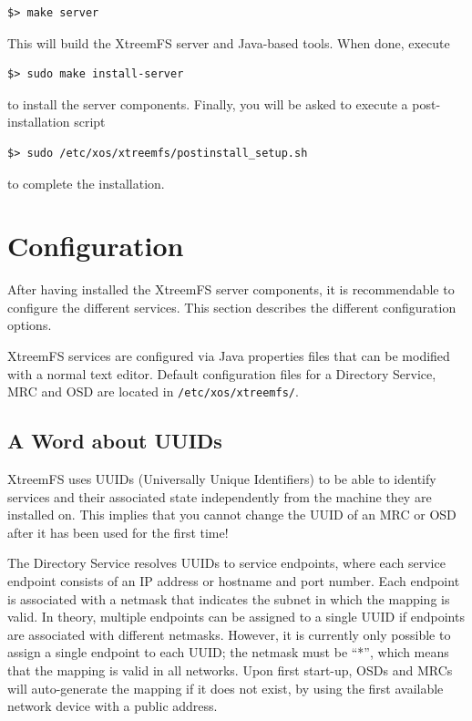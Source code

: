 \documentclass[a4paper,10pt]{book}
\begin{document}
\begin{verbatim}
$> make server
\end{verbatim}

This will build the XtreemFS server and Java-based tools. When done, execute

\begin{verbatim}
$> sudo make install-server
\end{verbatim}

to install the server components. Finally, you will be asked to execute a post-installation script

\begin{verbatim}
$> sudo /etc/xos/xtreemfs/postinstall_setup.sh
\end{verbatim}

to complete the installation.

\section{Configuration}
\label{sec:service_config}

After having installed the XtreemFS server components, it is recommendable to configure the different services. This section describes the different configuration options.

XtreemFS services are configured via Java properties files that can be modified with a normal text editor. Default configuration files for a Directory Service, MRC and OSD are located in \texttt{/etc/xos/xtreemfs/}.

\subsection{A Word about UUIDs}

XtreemFS uses UUIDs (Universally Unique Identifiers) to be able to identify services and their associated state independently from the machine they are installed on. This implies that you cannot change the UUID of an MRC or OSD after it has been used for the first time!

The Directory Service resolves UUIDs to service endpoints, where each service endpoint consists of an IP address or hostname and port number. Each endpoint is associated with a netmask that indicates the subnet in which the mapping is valid. In theory, multiple endpoints can be assigned to a single UUID if endpoints are associated with different netmasks. However, it is currently only possible to assign a single endpoint to each UUID; the netmask must be ``*'', which means that the mapping is valid in all networks. Upon first start-up, OSDs and MRCs will auto-generate the mapping if it does not exist, by using the first available network device with a public address.
\end{document}
